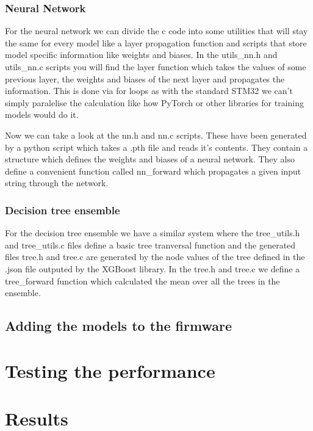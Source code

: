 \documentclass[11pt]{article}
\begin{document}
\subsubsection{Neural Network}
For the neural network we can divide the c code into some utilities that will stay the same for every model like a layer propagation function and scripts that store model specific information like weights and biases. In the utils\_nn.h and utils\_nn.c scripts you will find the layer function which takes the values of some previous layer, the weights and biases of the next layer and propagates the information. This is done via for loops as with the standard STM32 we can't simply paralelise the calculation like how PyTorch or other libraries for training models would do it.

Now we can take a look at the nn.h and nn.c scripts. These have been generated by a python script which takes a .pth file and reads it's contents. They contain a structure which defines the weights and biases of a neural network. They also define a convenient function called nn\_forward which propagates a given input string through the network.

\subsubsection{Decision tree ensemble}
For the decision tree ensemble we have a similar system where the tree\_utils.h and tree\_utils.c files define a basic tree tranversal function and the generated files tree.h and tree.c are generated by the node values of the tree defined in the .json file outputed by the XGBoost library. In the tree.h and tree.c we define a tree\_forward function which calculated the mean over all the trees in the ensemble.

\subsection{Adding the models to the firmware}

\section{Testing the performance}

\section{Results}
\end{document}
